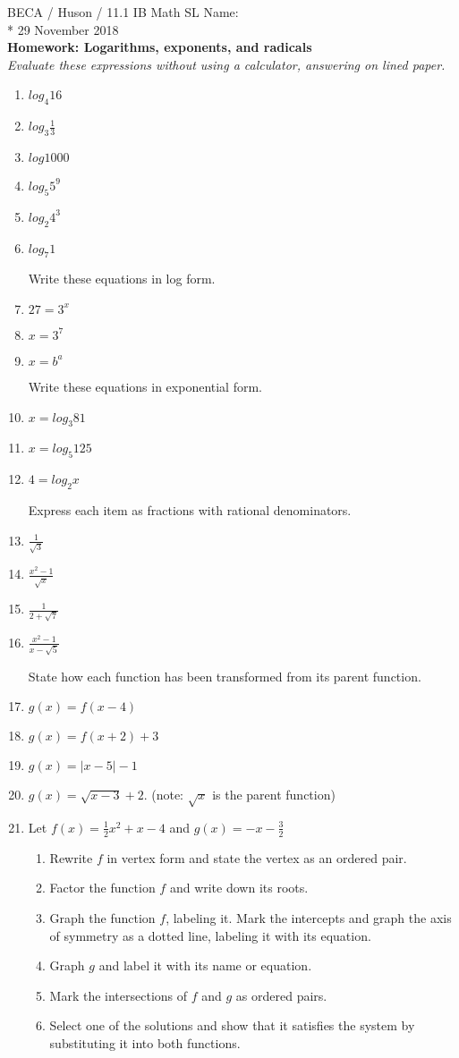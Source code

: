 \documentclass[]{book}
\begin{document}
\noindent BECA / Huson / 11.1 IB Math SL \hspace{2in} Name:\\*
29 November 2018\\[0.25cm]
\textbf{Homework: Logarithms, exponents, and radicals}\\
\textit{Evaluate these expressions without using a calculator, answering on lined paper.}

\begin{enumerate}
\item $log_4 16$
\item $log_3 \frac{1}{3}$
\item $log 1000$
\item $log_5 5^9$
\item $log_2 4^3$
\item $log_7 1$

Write these equations in log form.
\item $27=3^x$
\item $x=3^7$
\item $x=b^a$

Write these equations in exponential form.
\item $x=log_3 81$
\item $x = log_5 125$
\item $4 = log_2 x$

Express each item as fractions with rational denominators.
\item $\displaystyle   \frac{1}{\sqrt{3}}$
\item $\displaystyle  \frac{x^2-1}{\sqrt{x}}$
\item $\displaystyle  \frac{1}{2+\sqrt{7}}$
\item $\displaystyle  \frac{x^2-1}{x-\sqrt{5}}$

State how each function has been transformed from its parent function.
\item $g(x)=f(x-4)$
\item $g(x)= f(x+2) + 3$
\item $g(x) = |x-5|-1$
\item $g(x) = \sqrt{x-3}+2$. (note: $\sqrt{x}$ is the parent function)

\newpage
\item Let $f(x) = \frac{1}{2}x^2+x-4$ and $g(x)=-x-\frac{3}{2}$
\begin{enumerate}
    \item Rewrite $f$ in vertex form and state the vertex as an ordered pair.
    \item Factor the function $f$ and write down its roots.
    \item Graph the function $f$, labeling it. Mark the intercepts and graph the axis of symmetry as a dotted line, labeling it with its equation.
    \item Graph $g$ and label it with its name or equation.
    \item Mark the intersections of $f$ and $g$ as ordered pairs.
    \item Select one of the solutions and show that it satisfies the system by substituting it into both functions.
\end{enumerate}



\end{enumerate}
\end{document}
